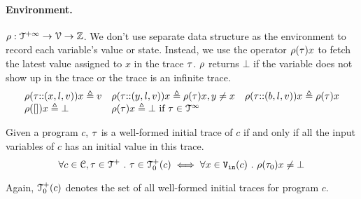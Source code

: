 \paragraph{Environment.} $\rho : {\mathcal{T}^{+\infty}}  \to \mathcal{V} \to \mathbb{Z}$.  
We don't use separate data structure as the environment to record each variable's value or state. Instead, we use the operator $\rho (\mathtt{\tau}) x$ to fetch the latest value assigned to $x$ in the trace $\mathtt{\tau}$. 
$\rho$ returns $\bot$ if the variable does not show up in the trace or the trace is an infinite trace.
\[
\begin{array}{lll}
\rho(\mathtt{\tau}  {\small ::} (x, l, v)) x \triangleq v
&
\rho(\mathtt{\tau} {\small ::} (y, l, v)) x \triangleq \rho(\mathtt{\tau}) x, y \neq x
&
\rho(\mathtt{\tau} {\small ::} (b, l, v)) x \triangleq \rho(\mathtt{\tau}) x
\\
\rho({[]} ) x \triangleq \bot
&
\rho(\mathtt{\tau} ) x \triangleq \bot ~ \text{if}~ \mathtt{\tau} \in \mathcal{T}^{\infty}
\end{array}
\]
%
\begin{defn}
  \label{def:initial_trace}
  Given a program $c$, $\mathtt{\tau}$ is a well-formed initial trace of $c$ if and only if all the input variables of $c$ has an initial value in this trace.
  \[
    \forall c \in \mathcal{C}, \mathtt{\tau} \in \mathcal{T}^{+} ~.~ \mathtt{\tau} \in \mathcal{T}^{+}_0(c) \iff 
    \forall x \in {\ensuremath{\mathtt{V_{\mathtt{in}}}}}(c) ~.~ \rho(\mathtt{\tau}_0) x \neq \bot
    \]
\end{defn}
%
Again, $\mathcal{T}^{+}_0(c)$ denotes the set of all well-formed initial traces for program $c$.
%
